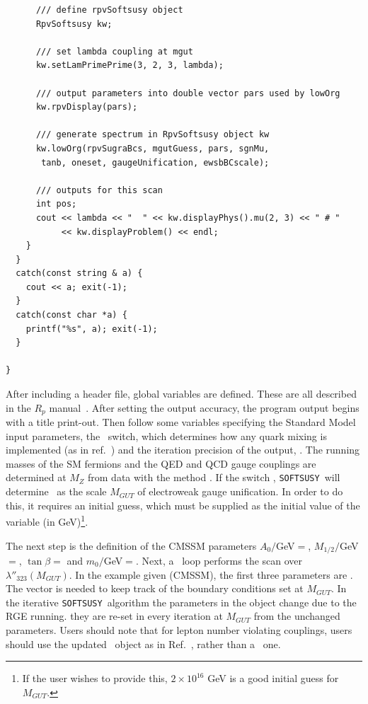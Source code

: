 \documentclass[final,3p,times,pdflatex]{elsarticle}
\def\SOFTSUSY{{\tt SOFTSUSY}}
\begin{document}
\begin{verbatim}
      /// define rpvSoftsusy object
      RpvSoftsusy kw;
      
      /// set lambda coupling at mgut
      kw.setLamPrimePrime(3, 2, 3, lambda); 
      
      /// output parameters into double vector pars used by lowOrg
      kw.rpvDisplay(pars);
      
      /// generate spectrum in RpvSoftsusy object kw
      kw.lowOrg(rpvSugraBcs, mgutGuess, pars, sgnMu,
       tanb, oneset, gaugeUnification, ewsbBCscale);
      
      /// outputs for this scan
      int pos;
      cout << lambda << "  " << kw.displayPhys().mu(2, 3) << " # " 
           << kw.displayProblem() << endl;
    }
  }
  catch(const string & a) {
    cout << a; exit(-1);
  }
  catch(const char *a) {
    printf("%s", a); exit(-1);
  }
  
}
\end{verbatim}
\normalsize
After including a header file, global variables are defined. These are all
described in the $R_p$ manual~\cite{Allanach:2001kg}.
After setting the output accuracy, 
the program output begins with a title print-out. Then follow
some variables specifying the Standard Model input parameters, the
~switch, which determines how any quark mixing is implemented
(as in ref.~\cite{Allanach:2001kg}) and
the iteration precision of the output, .
The running masses of the SM fermions and the QED and QCD gauge couplings are
determined at $M_Z$ from data with the method .
If the switch , \SOFTSUSY~will
determine ~as the scale $M_{GUT}$ of electroweak gauge
unification. In order to do 
this, it requires an initial guess, which must be 
supplied as the initial value of the variable  (in
GeV)\footnote{If the user wishes to provide 
  this, $2 \times 10^{16}$ GeV is a good initial
guess for $M_{GUT}$.}.

The next step is the definition of the CMSSM parameters $A_0/$GeV$=$,
$M_{1/2}/$GeV$=$, $\tan \beta=$ and
$m_0/$GeV$=$. Next, a ~loop performs the scan over
$\lambda''_{323}(M_{GUT})$. 
In the example given (CMSSM), the first three parameters are
. The  vector is
needed to keep track 
of the boundary conditions set at $M_{GUT}$.
In the iterative \SOFTSUSY~algorithm
the parameters in the  
object change due to
the RGE running\@.
they are re-set in
every iteration at $M_{GUT}$ from the unchanged ~
parameters. Users should note that for lepton number violating couplings,
users should use the updated ~object as in
Ref.~\cite{rpvneut}, rather than a 
~one.
\end{document}
